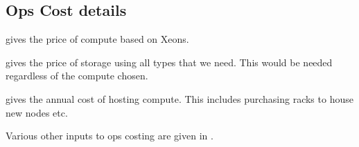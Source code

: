 \subsection{Ops Cost details}\label{sec:opsdetails}
 gives the price of compute based on Xeons.

 gives the price of storage using all  types that we need.
This would be needed regardless of the compute chosen.

\begin{landscape}

\end{landscape}

 gives the annual cost of hosting compute. This includes purchasing racks to house
new nodes etc.


Various other inputs to ops costing are given in .

